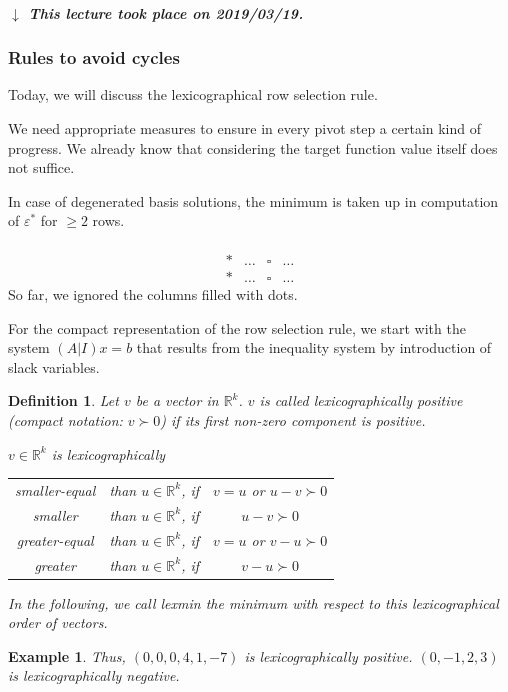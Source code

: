 \documentclass[a4paper]{article}
\numberwithin{lecref}{subsection}
\newtheorem*{Example}{Example}
\newtheorem*{Definition}{Definition}
\newcommand{\dateref}[1]{%
  \begin{mdframed}[backgroundcolor=gray!10,innerbottommargin=0pt,innertopmargin=0pt]
    \paragraph{\textit{$\downarrow$ This lecture took place on #1.}}%
  \end{mdframed}%
}
\begin{document}
\dateref{2019/03/19}

\subsubsection{Rules to avoid cycles}

Today, we will discuss the lexicographical row selection rule.

We need appropriate measures to ensure in every pivot step a certain kind of progress.
We already know that considering the target function value itself does not suffice.

In case of degenerated basis solutions, the minimum is taken up in computation of $\varepsilon^*$ for $\geq 2$ rows.

\[
	\begin{array}{c|ccc}
			& & & \\
	\hline
		* & \dots & \square & \dots \\
		* & \dots & \square & \dots
	\end{array}
\]
So far, we ignored the columns filled with dots.

For the compact representation of the row selection rule, we start with the system $(A|I) x = b$ that results from the inequality system by introduction of slack variables.

\begin{Definition}
	Let $v$ be a vector in $\mathbb R^k$.
	$v$ is called \emph{lexicographically positive} (compact notation: $v \succ 0$)
	if its first non-zero component is positive.

	$v \in \mathbb R^k$ is lexicographically
	\begin{tabular}{ccc}
		smaller-equal & than $u \in \mathbb R^k$, if & $v = u$ or $u - v \succ 0$ \\
		smaller       & than $u \in \mathbb R^k$, if & $u - v \succ 0$ \\
		greater-equal & than $u \in \mathbb R^k$, if & $v = u$ or $v - u \succ 0$ \\
		greater       & than $u \in \mathbb R^k$, if & $v - u \succ 0$ \\
	\end{tabular}

	In the following, we call \emph{lexmin} the minimum with respect to this lexicographical order of vectors.
\end{Definition}

\begin{Example}
	Thus, $(0,0,0,4,1,-7)$ is lexicographically positive.
	$(0, -1, 2, 3)$ is lexicographically negative.
\end{Example}
\end{document}
